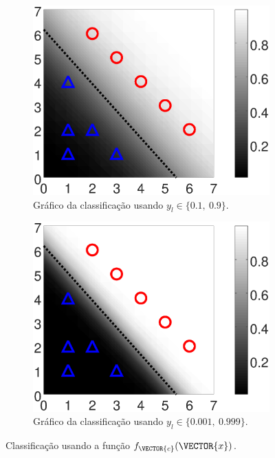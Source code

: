 \begin{figure}[!h]
    \begin{subfigure}[b]{0.45\textwidth}
        \centering
        \includegraphics[width=\textwidth]{chapters/classificacao/mfiles/reglogrnr1/ex1s1-reglogrnr1.eps}
        \caption{Gráfico da classificação usando $y_l \in \{0.1,~ 0.9\}$.}
        \label{fig:theo:reglogrnr1:xn:s1}
    \end{subfigure}
    \hfill
    \begin{subfigure}[b]{0.45\textwidth}
        \centering
        \includegraphics[width=\textwidth]{chapters/classificacao/mfiles/reglogrnr1/ex1s2-reglogrnr1.eps}
        \caption{Gráfico da classificação usando $y_l \in \{0.001,~ 0.999\}$.}
        \label{fig:theo:reglogrnr1:xn:s2}
    \end{subfigure}
    \caption{Classificação usando a função $f_{\VECTOR{c}}(\VECTOR{x})$.}
    \label{fig:theo:reglogrnr1:xn}
\end{figure}


